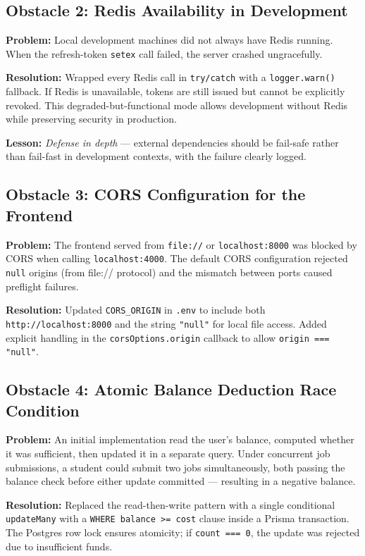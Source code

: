 \documentclass[12pt,a4paper]{report}
\begin{document}
\subsection{Obstacle 2: Redis Availability in Development}

\textbf{Problem:} Local development machines did not always have Redis running. When the
refresh-token \texttt{setex} call failed, the server crashed ungracefully.

\textbf{Resolution:} Wrapped every Redis call in \texttt{try/catch} with a
\texttt{logger.warn()} fallback. If Redis is unavailable, tokens are still issued but cannot
be explicitly revoked. This degraded-but-functional mode allows development without Redis
while preserving security in production.

\textbf{Lesson:} \emph{Defense in depth} — external dependencies should be fail-safe rather
than fail-fast in development contexts, with the failure clearly logged.

\subsection{Obstacle 3: CORS Configuration for the Frontend}

\textbf{Problem:} The frontend served from \texttt{file://} or \texttt{localhost:8000} was
blocked by CORS when calling \texttt{localhost:4000}. The default CORS configuration rejected
\texttt{null} origins (from file:// protocol) and the mismatch between ports caused
preflight failures.

\textbf{Resolution:} Updated \texttt{CORS\_ORIGIN} in \texttt{.env} to include both
\texttt{http://localhost:8000} and the string \texttt{"null"} for local file access. Added
explicit handling in the \texttt{corsOptions.origin} callback to allow \texttt{origin === "null"}.

\subsection{Obstacle 4: Atomic Balance Deduction Race Condition}

\textbf{Problem:} An initial implementation read the user's balance, computed whether it was
sufficient, then updated it in a separate query. Under concurrent job submissions, a student
could submit two jobs simultaneously, both passing the balance check before either update
committed — resulting in a negative balance.

\textbf{Resolution:} Replaced the read-then-write pattern with a single conditional
\texttt{updateMany} with a \texttt{WHERE balance >= cost} clause inside a Prisma transaction.
The Postgres row lock ensures atomicity; if \texttt{count === 0}, the update was rejected due
to insufficient funds.
\end{document}
